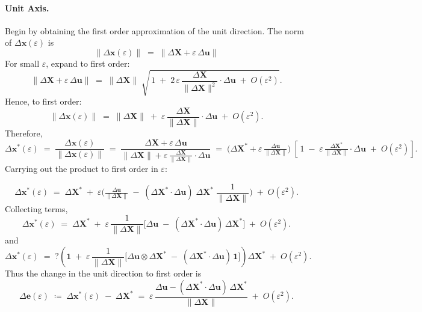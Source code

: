 \paragraph{Unit Axis.}

Begin by obtaining the first order approximation of the unit
direction. The norm of \(\Delta \bm{x}(\varepsilon)\) is 
\[
  \|\Delta \bm{x}(\varepsilon)\|
  \;=\;
  \|\Delta \bm{X} + \varepsilon\,\Delta \bm{u}\|
\] 
For small \(\varepsilon\), expand to first order:
\[
  \|\Delta \bm{X} + \varepsilon\,\Delta \bm{u}\|
  \;=\;
  \|\Delta \bm{X}\|\;
  \sqrt{\,1 
           \;+\; 
           2\,\varepsilon\,\frac{\Delta \bm{X}}{\|\Delta \bm{X}\|^2}\cdot \Delta \bm{u}
           \;+\; O(\varepsilon^2)
         }.
\] 
Hence, to first order: 
\[
  \|\Delta \bm{x}(\varepsilon)\| 
  \;=\;
  \|\Delta \bm{X}\|
  \;+\;
  \varepsilon\,
  \frac{\Delta \bm{X}}{\|\Delta \bm{X}\|}\cdot \Delta \bm{u}
  \;+\; 
  O(\varepsilon^2).
\]
%
Therefore, 
\[
  \Delta \bm{x}^\ast(\varepsilon)
  \;=\;
  \frac{\Delta \bm{x}(\varepsilon)}{\|\Delta \bm{x}(\varepsilon)\|}
  \;=\;
  \frac{\Delta \bm{X} + \varepsilon\,\Delta \bm{u}}
       {\|\Delta \bm{X}\| 
        + \varepsilon\,\frac{\Delta \bm{X}}{\|\Delta \bm{X}\|}\cdot \Delta \bm{u}
       }
  \;=\;
  \bigl(\Delta \bm{X}^\ast + \varepsilon\,\tfrac{\Delta \bm{u}}{\|\Delta \bm{X}\|}\bigr)\;\left[\,
     1 
     \;-\;
     \varepsilon\,\tfrac{\Delta \bm{X}^\ast}{\|\Delta \bm{X}\|}\cdot \Delta \bm{u}
     \;+\;
     O(\varepsilon^2)
  \right].
\] 
Carrying out the product to first order in \(\varepsilon\):

\[
  \Delta \bm{x}^\ast(\varepsilon)
  \;=\;
  \Delta \bm{X}^\ast
  \;+\;
  \varepsilon
  \biggl(
     \tfrac{\Delta \bm{u}}{\|\Delta \bm{X}\|}
     \;-\;
     (\Delta \bm{X}^\ast \!\cdot \Delta \bm{u})\;\Delta \bm{X}^\ast \;\frac{1}{\|\Delta \bm{X}\|}
  \biggr)
  \;+\;
  O(\varepsilon^2).
\] 
Collecting terms,
\[
  \Delta \bm{x}^\ast(\varepsilon)
  \;=\;
  \Delta \bm{X}^\ast
  \;+\;
  \varepsilon\,
  \frac{1}{\|\Delta \bm{X}\|}\bigl[\Delta \bm{u} 
           \;-\; 
           (\Delta \bm{X}^\ast\!\cdot \Delta \bm{u})\,\Delta \bm{X}^\ast
    \bigr]
  \;+\;
  O(\varepsilon^2).
\]
and
\[
\Delta \bm{x}^\ast(\varepsilon)
  \;=\; ?\left(
  \mathbf{1}
  \;+\;
  \varepsilon\,
  \frac{1}{\|\Delta \bm{X}\|}\bigl[
      \Delta \bm{u} \otimes \Delta\bm{X}^*
      \;-\; 
      (\Delta \bm{X}^\ast\!\cdot \Delta \bm{u})\,\mathbf{1} %
    \bigr]
  \right) \Delta \bm{X}^\ast
  \;+\;
  O(\varepsilon^2).
\]
Thus the change in the unit direction to first order is 
\begin{equation}
  \Delta \mathbf{e}(\varepsilon)
  \;\coloneq\;
  \Delta \bm{x}^\ast(\varepsilon) \;-\; \Delta \bm{X}^\ast
  \;=\;
  \varepsilon\,
  \frac{
    \Delta \bm{u} 
           - (\Delta \bm{X}^\ast\!\cdot \Delta \bm{u})\,\Delta \bm{X}^\ast
  }{\|\Delta \bm{X}\|}
  \;+\;
  O(\varepsilon^2).
  \label{eq:delta-basis}
\end{equation}

